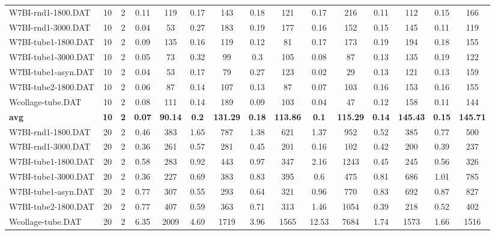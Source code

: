 \begin{table}[!ht]
{\begin{tabular}{lcccccccccccccc}
W7BI-rnd1-1800.DAT & 10 & 2 &  \textcolor{blue2}{0.11} & 119 & 0.17 & 143 & 0.18 & 121 & 0.17 & 216 &  \textcolor{blue2}{0.11} & 112 & 0.15 & 166 \\
W7BI-rnd1-3000.DAT & 10 & 2 &  \textcolor{blue2}{0.04} & 53 & 0.27 & 183 & 0.19 & 177 & 0.16 & 152 & 0.15 & 145 & 0.11 & 119 \\
W7BI-tube1-1800.DAT & 10 & 2 &  \textcolor{blue2}{0.09} & 135 & 0.16 & 119 & 0.12 & 81 & 0.17 & 173 & 0.19 & 194 & 0.18 & 155 \\
W7BI-tube1-3000.DAT & 10 & 2 &  \textcolor{blue2}{0.05} & 73 & 0.32 & 99 & 0.3 & 105 & 0.08 & 87 & 0.13 & 135 & 0.19 & 122 \\
W7BI-tube1-asyn.DAT & 10 & 2 & 0.04 & 53 & 0.17 & 79 & 0.27 & 123 &  \textcolor{blue2}{0.02} & 29 & 0.13 & 121 & 0.13 & 159 \\
W7BI-tube2-1800.DAT & 10 & 2 &  \textcolor{blue2}{0.06} & 87 & 0.14 & 107 & 0.13 & 87 & 0.07 & 103 & 0.16 & 153 & 0.16 & 155 \\
Wcollage-tube.DAT & 10 & 2 & 0.08 & 111 & 0.14 & 189 & 0.09 & 103 &  \textcolor{blue2}{0.04} & 47 & 0.12 & 158 & 0.11 & 144 \\
\cline{1-15} \textbf{avg} & \textbf{10} & \textbf{2} & \textbf{0.07} & \textbf{90.14} & \textbf{0.2} & \textbf{131.29} & \textbf{0.18} & \textbf{113.86} & \textbf{0.1} & \textbf{115.29} & \textbf{0.14} & \textbf{145.43} & \textbf{0.15} & \textbf{145.71} \\ \cline{1-15}
W7BI-rnd1-1800.DAT & 20 & 2 &  \textcolor{blue2}{0.46} & 383 & 1.65 & 787 & 1.38 & 621 & 1.37 & 952 & 0.52 & 385 & 0.77 & 500 \\
W7BI-rnd1-3000.DAT & 20 & 2 & 0.36 & 261 & 0.57 & 281 & 0.45 & 201 &  \textcolor{blue2}{0.16} & 102 & 0.42 & 200 & 0.39 & 237 \\
W7BI-tube1-1800.DAT & 20 & 2 & 0.58 & 283 & 0.92 & 443 & 0.97 & 347 & 2.16 & 1243 &  \textcolor{blue2}{0.45} & 245 & 0.56 & 326 \\
W7BI-tube1-3000.DAT & 20 & 2 &  \textcolor{blue2}{0.36} & 227 & 0.69 & 383 & 0.83 & 395 & 0.6 & 475 & 0.81 & 686 & 1.01 & 785 \\
W7BI-tube1-asyn.DAT & 20 & 2 & 0.77 & 307 &  \textcolor{blue2}{0.55} & 293 & 0.64 & 321 & 0.96 & 770 & 0.83 & 692 & 0.87 & 827 \\
W7BI-tube2-1800.DAT & 20 & 2 & 0.77 & 407 & 0.59 & 363 & 0.71 & 313 & 1.46 & 1054 &  \textcolor{blue2}{0.39} & 218 & 0.52 & 402 \\
Wcollage-tube.DAT & 20 & 2 & 6.35 & 2009 & 4.69 & 1719 & 3.96 & 1565 & 12.53 & 7684 & 1.74 & 1573 &  \textcolor{blue2}{1.66} & 1516 \\

\end{tabular}}
\end{table}
